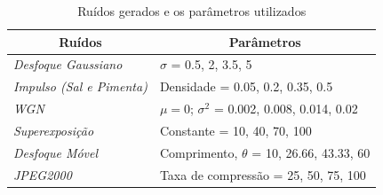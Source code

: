 \begin{table}[h!]
\centering
\caption{Ruídos gerados e os parâmetros utilizados}
\label{tab:experimentos:ruidos}
\begin{tabular}{|l|l|}
\hline
\multicolumn{1}{|c|}{\textbf{Ruídos}} & \multicolumn{1}{c|}{\textbf{Parâmetros}} \\ \hline
\textit{Desfoque Gaussiano} & {}$\sigma$ = 0.5, 2, 3.5, 5 {} \\ \hline
\textit{Impulso (Sal e Pimenta)} & {}Densidade = 0.05, 0.2, 0.35, 0.5 {} \\ \hline
\textit{\acrshort{WGN}} & {}$\mu = 0$; $\sigma^2$ = 0.002, 0.008, 0.014, 0.02{} \\ \hline
\textit{Superexposição} & {}Constante = 10, 40, 70, 100 {} \\ \hline
\textit{Desfoque Móvel} & {}Comprimento, $\theta$ = 10, 26.66, 43.33, 60{} \\ \hline
\textit{JPEG2000} & {}Taxa de compressão = 25, 50, 75, 100{} \\ \hline
\end{tabular}
\end{table}


